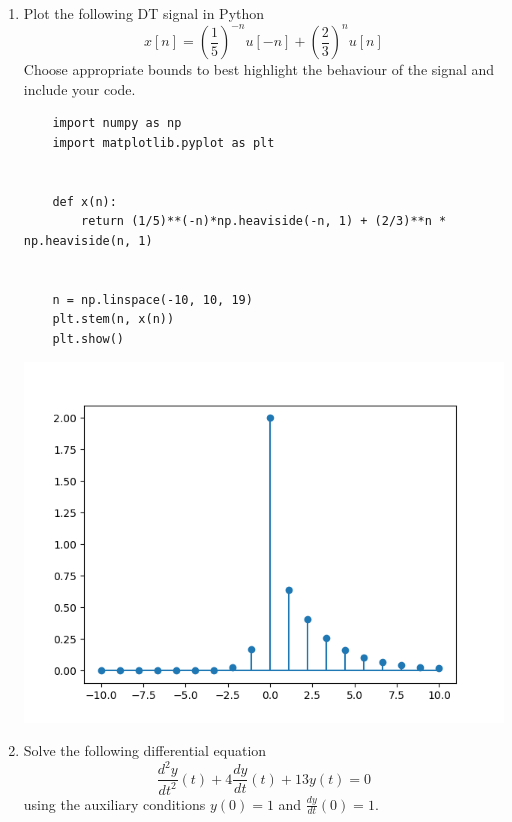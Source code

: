 \documentclass{article}
\begin{document}
\begin{enumerate}
\item Plot the following DT signal in Python
\begin{equation}
    x[n] = \left(\frac{1}{5}\right)^{-n} u[-n] +\left(\frac{2}{3}\right)^nu[n]
\end{equation}  
Choose appropriate bounds to best highlight the behaviour of the signal and include your code.

\lstset{language=Python}
\lstset{frame=lines}
\lstset{basicstyle=\footnotesize}
\begin{lstlisting}
    import numpy as np
    import matplotlib.pyplot as plt
    
    
    def x(n):
        return (1/5)**(-n)*np.heaviside(-n, 1) + (2/3)**n * np.heaviside(n, 1)
    
    
    n = np.linspace(-10, 10, 19)
    plt.stem(n, x(n))
    plt.show()
\end{lstlisting}
\begin{center}
    \includegraphics[width = .6\textwidth]{1.png}
\end{center}
\newpage
\item Solve the following differential equation
\begin{equation}
    \frac{d^2y}{dt^2}(t) + 4 \frac{dy}{dt}(t) + 13y(t) = 0
\end{equation}
using the auxiliary conditions $y(0) = 1$ and $\frac{dy}{dt}(0) = 1$.


\end{enumerate}
\end{document}

